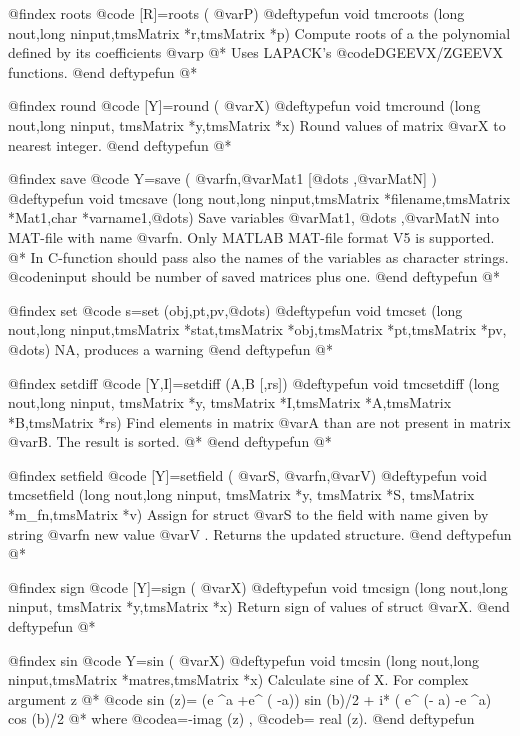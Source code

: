 @findex   roots
@code{  [R]=roots ( @var{P})}
@deftypefun void tmcroots  (long nout,long ninput,tmsMatrix *r,tmsMatrix *p)
Compute  roots of a the polynomial defined by its coefficients   @var{p} @*
Uses LAPACK's @code{DGEEVX/ZGEEVX}  functions. 
@end deftypefun
@*

@findex  round
@code{  [Y]=round  ( @var{X})}
@deftypefun void tmcround  (long nout,long ninput, tmsMatrix *y,tmsMatrix *x)
Round values of matrix @var{X}  to nearest integer.
@end deftypefun
@*

@findex  save
@code{ Y=save  ( @var{fn},@var{Mat1} [@dots{} ,@var{MatN}] ) }
@deftypefun void tmcsave  (long nout,long ninput,tmsMatrix *filename,tmsMatrix *Mat1,char *varname1,@dots{})
Save variables  @var{Mat1},  @dots{} ,@var{MatN} into   MAT-file with name @var{fn}.  Only MATLAB MAT-file  format V5 is supported. @*
In C-function should pass also the names of the variables as character strings. @code{ninput} should be number of saved matrices plus one.
@end deftypefun
@*


@findex  set
@code{ s=set  (obj,pt,pv,@dots{}) }
@deftypefun void tmcset  (long nout,long ninput,tmsMatrix *stat,tmsMatrix *obj,tmsMatrix *pt,tmsMatrix *pv, @dots{})
NA, produces a warning
@end deftypefun
@*


@findex  setdiff
@code{ [Y,I]=setdiff  (A,B [,rs]) }
@deftypefun void tmcsetdiff  (long nout,long ninput, tmsMatrix *y, tmsMatrix *I,tmsMatrix *A,tmsMatrix *B,tmsMatrix *rs)
Find elements in matrix @var{A}  than are not present in matrix @var{B}. The result is sorted. @*
@end deftypefun
@*


@findex  setfield
@code{  [Y]=setfield  ( @var{S}, @var{fn},@var{V})}
@deftypefun void tmcsetfield (long nout,long ninput, tmsMatrix *y, tmsMatrix *S, tmsMatrix *m_fn,tmsMatrix *v)
Assign for struct @var{S}  to the field with name given by string @var{fn} new value @var{V} . Returns the updated structure.
@end deftypefun
@*

@findex  sign
@code{  [Y]=sign  ( @var{X})}
@deftypefun void tmcsign  (long nout,long ninput, tmsMatrix *y,tmsMatrix *x)
Return  sign  of values of struct @var{X}.
@end deftypefun
@*


@findex   sin
@code{  Y=sin ( @var{X})}
@deftypefun void  tmcsin  (long nout,long ninput,tmsMatrix *matres,tmsMatrix *x)
Calculate  sine of X. For complex argument z @*
  @code{ sin (z)= (e ^a +e^ ( -a)) sin (b)/2  + i*  ( e^ (- a) -e ^a) cos (b)/2   } @*
where @code{a=-imag (z)} , @code{b= real (z)}.
@end deftypefun


